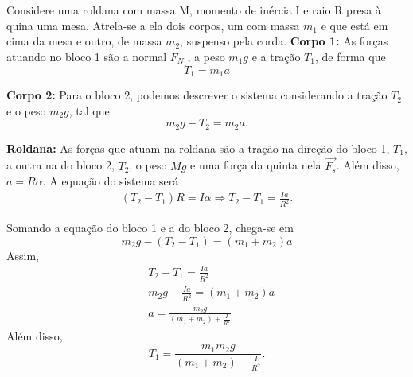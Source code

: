 \documentclass[physicsII_notes.tex]{subfiles}
\begin{document}
\begin{example}
	Considere uma roldana com massa M, momento de inércia I e raio R presa à quina uma mesa. Atrela-se a ela dois corpos, um com massa \(m_{1}\) e que está em cima da mesa
	e outro, de massa \(m_{2}\), suspenso pela corda.
	\textbf{Corpo 1:}
	As forças atuando no bloco 1 são a normal \(F_{N_{1}}\), a peso \(m_{1}g\) e a tração \(T_{1}\), de forma que
	\[
		T_{1}=m_{1}a
	\]

	\textbf{Corpo 2:}
	Para o bloco 2, podemos descrever o sistema considerando a tração \(T_{2}\) e o peso \(m_{2}g\), tal que
	\[
		m_{2}g - T_{2} = m_{2}a.
	\]

	\textbf{Roldana:}
	As forças que atuam na roldana são a tração na direção do bloco 1, \(T_{1}\), a outra na do bloco 2, \(T_{2}\), o peso
	\(Mg\) e uma força da quinta nela \(\vec{F_{s}}\). Além disso, \(a=R\alpha \). A equação do sistema será
	\begin{align*}
		(T_{2}-T_{1})R = I\alpha \Rightarrow  T_{2} - T_{1} = \frac{Ia}{R^{2}}.
	\end{align*}

	Somando a equação do bloco 1 e a do bloco 2, chega-se em
	\[
		m_{2}g - (T_{2}-T_{1}) = (m_{1}+m_{2})a
	\]
	Assim,
	\begin{align*}
		 & T_{2} - T_{1} = \frac{Ia}{R^{2}}                 \\
		 & m_{2}g - \frac{Ia}{R^{2}} = (m_{1}+m_{2})a       \\
		 & a = \frac{m_{2}g}{(m_{1}+m_2) + \frac{I}{R^{2}}}
	\end{align*}
	Além disso,
	\[
		T_{1} = \frac{m_{1}m_{2}g}{(m_{1}+m_{2})+\frac{I}{R^{2}}}.
	\]
\end{example}
\end{document}

